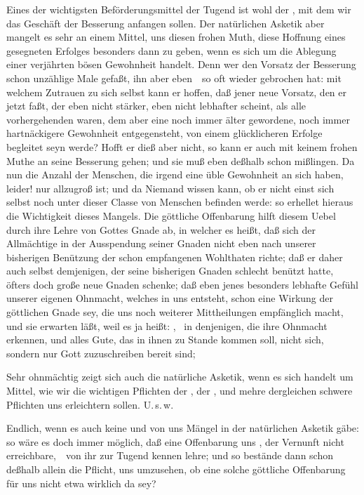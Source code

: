 \begin{aufza}
\begin{aufzb}
\item Eines der wichtigsten Beförderungsmittel der Tugend ist wohl der , mit dem wir das Geschäft der Besserung anfangen sollen. Der natürlichen Asketik aber mangelt es sehr an einem Mittel, uns diesen frohen Muth, diese Hoffnung eines gesegneten Erfolges besonders dann zu geben, wenn es sich um die Ablegung einer verjährten bösen Gewohnheit handelt. Denn wer den Vorsatz der Besserung schon unzählige Male gefaßt, ihn aber eben~\ so oft wieder gebrochen hat: mit welchem Zutrauen zu sich selbst kann er hoffen, daß jener neue Vorsatz, den er jetzt faßt, der eben nicht stärker, eben nicht lebhafter scheint, als alle vorhergehenden waren, dem aber eine noch immer älter gewordene, noch immer hartnäckigere Gewohnheit entgegensteht, von einem glücklicheren Erfolge begleitet seyn werde? Hofft er dieß aber nicht, so kann er auch mit keinem frohen Muthe an seine Besserung gehen; und sie muß eben deßhalb schon mißlingen. Da nun die Anzahl der Menschen, die irgend eine üble Gewohnheit an sich haben, leider! nur allzugroß ist; und da Niemand wissen kann, ob er nicht einst sich selbst noch unter dieser Classe von Menschen befinden werde: so erhellet hieraus die Wichtigkeit dieses Mangels. Die göttliche Offenbarung hilft diesem Uebel durch ihre Lehre von Gottes Gnade ab, in welcher es heißt, daß sich der Allmächtige in der Ausspendung seiner Gnaden nicht eben nach unserer bisherigen Benützung der schon empfangenen Wohlthaten richte; daß er daher auch selbst demjenigen, der seine bisherigen Gnaden schlecht benützt hatte, öfters doch große neue Gnaden schenke; daß eben jenes besonders lebhafte Gefühl unserer eigenen Ohnmacht, welches in uns entsteht, schon eine Wirkung der göttlichen Gnade sey, die uns noch weiterer Mittheilungen empfänglich macht, und sie erwarten läßt, weil es ja heißt: , \dh\ in denjenigen, die ihre Ohnmacht erkennen, und alles Gute, das in ihnen zu Stande kommen soll, nicht sich, sondern nur Gott zuzuschreiben bereit sind; \usw\
\item Sehr ohnmächtig zeigt sich auch die natürliche Asketik, wenn es sich handelt um Mittel, wie wir die wichtigen Pflichten der , der , und mehre dergleichen schwere Pflichten uns erleichtern sollen. U.\,s.\,w.
\end{aufzb}
\item Endlich, wenn es auch keine  und von uns  Mängel in der natürlichen Asketik gäbe: so wäre es doch immer möglich, daß eine Offenbarung uns , der Vernunft nicht erreichbare,~\ von ihr  zur Tugend kennen lehre; und so bestände dann schon deßhalb allein die Pflicht, uns umzusehen, ob eine solche göttliche Offenbarung für uns nicht etwa wirklich da sey?
\end{aufza}
   
